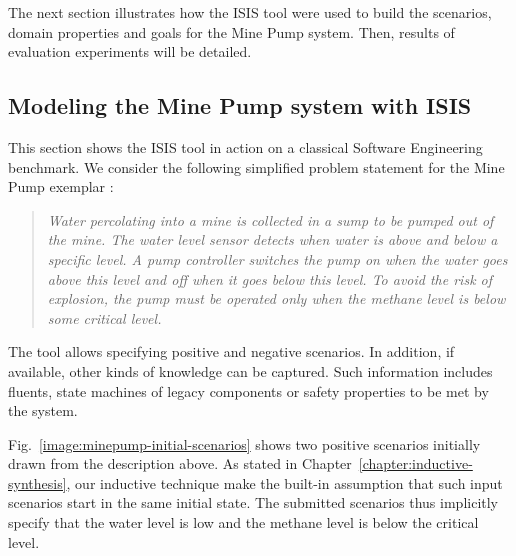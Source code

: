The next section illustrates how the ISIS tool were used to build the scenarios, domain properties and goals for the Mine Pump system. Then, results of evaluation experiments will be detailed.

\subsection{Modeling the Mine Pump system with ISIS\label{subsection:evaluation-isis-modeling-session}}

This section shows the ISIS tool in action on a classical Software Engineering benchmark. We consider the following simplified problem statement for the Mine Pump exemplar \cite{Joseph:1996}:
\begin{quotation}
\emph{Water percolating into a mine is collected in a sump to be pumped out of the mine. The water level sensor detects when water is above and below a specific level. A pump controller switches the pump on when the water goes above this level and off when it goes below this level. To avoid the risk of explosion, the pump must be operated only when the methane level is below some critical level.}
\end{quotation}

The tool allows specifying positive and negative scenarios. In addition, if available, other kinds of knowledge can be captured. Such information includes fluents, state machines of legacy components or safety properties to be met by the system.

Fig.~\ref{image:minepump-initial-scenarios} shows two positive scenarios initially drawn from the description above. As stated in Chapter~\ref{chapter:inductive-synthesis}, our inductive technique make the built-in assumption that such input scenarios start in the same initial state. The submitted scenarios thus implicitly specify that the water level is low and the methane level is below the critical level. 

